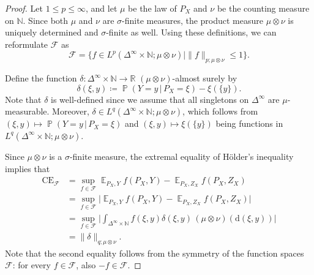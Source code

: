 \documentclass{article}
\DeclareMathOperator{\Prob}{\mathbb{P}}
\DeclareMathOperator{\Exp}{\mathbb{E}}
\begin{document}
\begin{proof}
    Let $1 \leq p \leq \infty$, and let $\mu$ be the law of $P_X$ and $\nu$ be the counting measure on $\mathbb{N}$.
    Since both $\mu$ and $\nu$ are $\sigma$-finite measures, the product measure $\mu \otimes \nu$ is uniquely
    determined and $\sigma$-finite as well. Using these definitions, we can reformulate $\mathcal{F}$ as
    \begin{equation*}
        \mathcal{F} =  \{f \in L^p(\Delta^\infty \times \mathbb{N}; \mu \otimes \nu) \mid \|f\|_{p; \mu \otimes \nu} \leq 1\}.
    \end{equation*}

    Define the function $\delta \colon \Delta^{\infty} \times \mathbb{N} \to \mathbb{R}$ $(\mu \otimes \nu)$-almost
    surely by
    \begin{equation*}
        \delta(\xi, y) \coloneqq \Prob(Y = y \,|\, P_X = \xi) - \xi(\{y\}).
    \end{equation*}
    Note that $\delta$ is well-defined since we assume that all singletons on $\Delta^{\infty}$ are
    $\mu$-measurable. Moreover, $\delta \in L^q(\Delta^\infty \times \mathbb{N}; \mu \otimes \nu)$,
    which follows from $(\xi, y) \mapsto \Prob(Y = y \,|\, P_X = \xi)$
    and $(\xi, y) \mapsto \xi(\{y\})$ being functions in $L^q(\Delta^\infty \times \mathbb{N}; \mu \otimes \nu)$.

    Since $\mu \otimes \nu$ is a $\sigma$-finite measure, the extremal equality of Hölder's inequality implies that
    \begin{equation*}
        \begin{split}
            \mathrm{CE}_{\mathcal{F}} &= \sup_{f \in \mathcal{F}} \Exp_{P_X,Y} f(P_X,Y) - \Exp_{P_X,Z_X} f(P_X, Z_X) \\
            &= \sup_{f \in \mathcal{F}} \bigg| \Exp_{P_X,Y} f(P_X,Y) - \Exp_{P_X,Z_X} f(P_X, Z_X) \bigg| \\
            &= \sup_{f \in \mathcal{F}} \bigg| \int_{\Delta^{\infty} \times \mathbb{N}} f(\xi, y) \delta(\xi, y) \,(\mu \otimes \nu)(\mathrm{d}(\xi, y)) \bigg| \\
            &= \|\delta\|_{q;\mu \otimes \nu}.
        \end{split}
    \end{equation*}
    Note that the second equality follows from the symmetry of the function spaces $\mathcal{F}$: for every $f \in \mathcal{F}$, also $-f \in \mathcal{F}$.


\end{proof}
\end{document}
